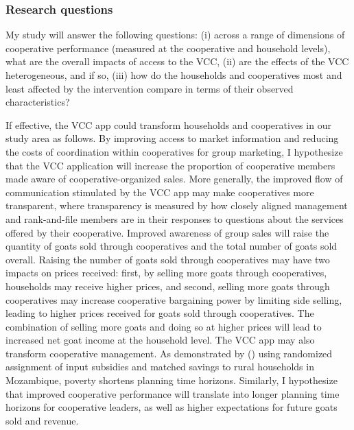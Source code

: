 \documentclass[11pt]{article}
\begin{document}
\subsubsection{Research questions} \label{sec:E3_hypothesis}
My study will answer the following questions: (i) across a range of dimensions of cooperative performance (measured at the cooperative and household levels), what are the overall impacts of access to the VCC, (ii) are the effects of the VCC heterogeneous, and if so, (iii) how do the households and cooperatives most and least affected by the intervention compare in terms of their observed characteristics?

If effective, the VCC app could transform households and cooperatives in our study area as follows. By improving access to market information and reducing the costs of coordination within cooperatives for group marketing, I hypothesize that the VCC application will increase the proportion of cooperative members made aware of cooperative-organized sales. More generally, the improved flow of communication stimulated by the VCC app may make cooperatives more transparent, where transparency is measured by how closely aligned management and rank-and-file members are in their responses to questions about the services offered by their cooperative.
Improved awareness of group sales will raise the quantity of goats sold through cooperatives and the total number of goats sold overall. Raising the number of goats sold through cooperatives may have two impacts on prices received: first, by selling more goats through cooperatives, households may receive higher prices, and second, selling more goats through cooperatives may increase cooperative bargaining power by limiting side selling, leading to higher prices received for goats sold through cooperatives. The combination of selling more goats and doing so at higher prices will lead to increased net goat income at the household level. 
The VCC app may also transform cooperative management. As demonstrated by \citeauthor{lajaaj.17} (\citeyear{lajaaj.17}) using randomized assignment of input subsidies and matched savings to rural households in Mozambique, poverty shortens planning time horizons. Similarly, I hypothesize that improved cooperative performance will translate into longer planning time horizons for cooperative leaders, as well as higher expectations for future goats sold and revenue. %
\end{document}

